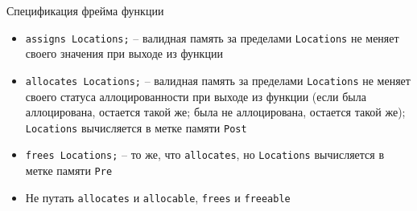 \documentclass[hyperref={unicode=true}]{beamer}
\begin{document}
    \begin{frame}[fragile]{Спецификация фрейма функции}
    \begin{itemize}
    \item
    \verb|assigns Locations;| -- валидная память за пределами \verb|Locations|
    не меняет своего значения при выходе из функции
    \item
    \verb|allocates Locations;| -- валидная память за пределами \verb|Locations|
    не меняет своего статуса аллоцированности при выходе из функции
    (если была аллоцирована, остается такой же; была не аллоцирована,
     остается такой же); \verb|Locations| вычисляется в метке памяти \verb|Post|
    \item
    \verb|frees Locations;| -- то же, что \verb|allocates|, но \verb|Locations|
    вычисляется в метке памяти \verb|Pre|
    \item
    Не путать \verb|allocates| и \verb|allocable|, \verb|frees| и \verb|freeable|
    \end{itemize}
    \end{frame}


\end{document}
